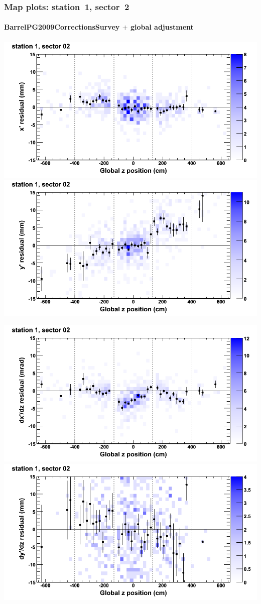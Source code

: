 \documentclass[compress]{beamer}
\begin{document}
\begin{frame}
\frametitle{Map plots: station~1, sector~2}
\framesubtitle{BarrelPG2009CorrectionsSurvey $+$ global adjustment}
\includegraphics[width=0.5\linewidth]{mapplots_re01/DTvsz_st1sec02_x.png}
\includegraphics[width=0.5\linewidth]{mapplots_re01/DTvsz_st1sec02_y.png}

\includegraphics[width=0.5\linewidth]{mapplots_re01/DTvsz_st1sec02_dxdz.png}
\includegraphics[width=0.5\linewidth]{mapplots_re01/DTvsz_st1sec02_dydz.png}
\end{frame}
\end{document}
